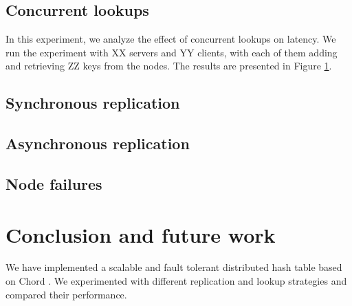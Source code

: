 \documentclass{sig-alternate-10pt}
\begin{document}
\subsection{Concurrent lookups}
In this experiment, we analyze the effect of concurrent lookups on latency. We run the experiment with XX servers and YY clients, with each of them adding and retrieving ZZ keys from the nodes. The results are presented in Figure \ref{}.


\subsection{Synchronous replication}

\subsection{Asynchronous replication}

\subsection{Node failures}

\section{Conclusion and future work}
We have implemented a scalable and fault tolerant distributed hash table based on Chord \cite{chord}. We experimented with different replication and lookup strategies and compared their performance. 


%

%
%
\end{document}
